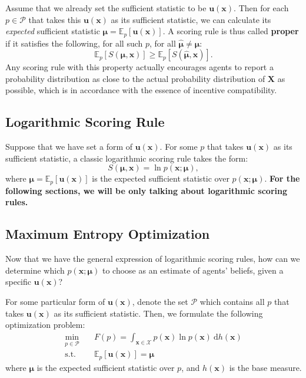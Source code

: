 \documentclass[12pt]{article}
\begin{document}
Assume that we already set the sufficient statistic to be $\mathbf{u}(\mathbf{x})$. Then for each $p\in \mathcal{P}$ that takes this $\mathbf{u}(\mathbf{x})$ as its sufficient statistic, we can calculate its \textit{expected} sufficient statistic $\bm{\mu}=\mathbb{E}_p[\mathbf{u}(\mathbf{x})]$. A scoring rule is thus called \textbf{proper} if it satisfies the following, for all such $p$, for all $\bm{\hat{\mu}}\neq\bm{\mu}$:
\[\mathbb{E}_p[S(\bm{\mu},\mathbf{x})]\geqslant \mathbb{E}_p[S(\bm{\hat{\mu}},\mathbf{x})].\]
Any scoring rule with this property actually encourages agents to report a probability distribution as close to the actual probability distribution of $\mathbf{X}$ as possible, which is in accordance with the essence of incentive compatibility.

\subsection{Logarithmic Scoring Rule}
Suppose that we have set a form of $\mathbf{u}(\mathbf{x})$. For some $p$ that takes $\mathbf{u}(\mathbf{x})$ as its sufficient statistic, a classic logarithmic scoring rule takes the form:
\[S(\bm{\mu},\mathbf{x})=\ln p(\mathbf{x};\bm{\mu}),\]
where $\bm{\mu}=\mathbb{E}_p[\mathbf{u}(\mathbf{x})]$ is the expected sufficient statistic over $p(\mathbf{x};\bm{\mu})$. \textbf{For the following sections, we will be only talking about logarithmic scoring rules.}

\subsection{Maximum Entropy Optimization}
Now that we have the general expression of logarithmic scoring rules, how can we determine which $p(\mathbf{x};\bm{\mu})$ to choose as an estimate of agents' beliefs, given a specific $\mathbf{u}(\mathbf{x})$?

For some particular form of $\mathbf{u}(\mathbf{x})$, denote the set $\mathcal{P}$ which contains all $p$ that takes $\mathbf{u}(\mathbf{x})$ as its sufficient statistic. Then, we formulate the following optimization problem:
\begin{align*}
    \min_{p\in \mathcal{P}} & \quad F(p)=\int_{\mathbf{x}\in \mathcal{X}}p(\mathbf{x})\ln p(\mathbf{x})\ \mathrm{d}h(\mathbf{x}) \\
    \mathrm{s.t.}           & \quad \mathbb{E}_p[\mathbf{u}(\mathbf{x})]=\bm{\mu}
\end{align*}
where $\bm{\mu}$ is the expected sufficient statistic over $p$, and $h(\mathbf{x})$ is the base measure.
\end{document}
